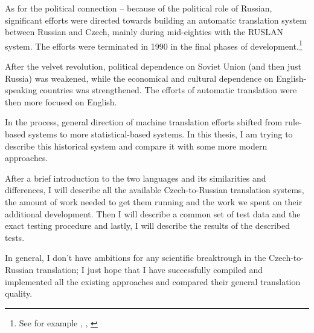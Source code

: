 As for the political connection -- because of the 
political role of Russian,
 significant efforts were directed towards building an automatic translation system between Russian and Czech, mainly during mid-eighties with the RUSLAN system. The efforts were terminated in 1990 in the final phases of development.\footnote{See for example \cite{recycled}, \cite{hajic1987}, \cite{olivaruslan}} 

After the velvet revolution, political dependence on Soviet Union (and then just Russia) was weakened, while the economical and cultural dependence on English-speaking countries was strengthened. The efforts of automatic translation were then more focused on English. 

In the process, general direction of machine translation efforts shifted from rule-based systems to more statistical-based systems. In this thesis, I am trying to describe this historical system and compare it with some more modern approaches.


After a brief introduction to the two languages and its similarities and differences, I will describe all the available Czech-to-Russian translation systems, the amount of work needed to get them running and the work we spent on their additional development. Then I will describe a common set of test data and the exact testing procedure and lastly, I will describe the results of the described tests.

In general, I don't have ambitions for any scientific breaktrough in the Czech-to-Russian translation; I just hope that I have successfully compiled and implemented all the existing approaches and compared their general translation quality.
